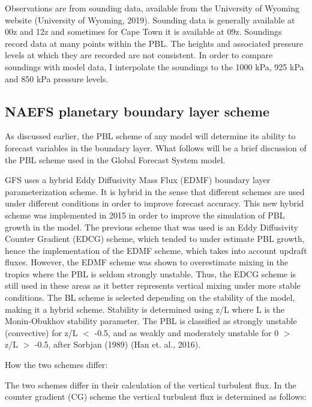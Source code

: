 \documentclass[12pt]{article}
\begin{document}
Observations are from sounding data, available from the University of Wyoming website 
(University of Wyoming, 2019).  Sounding data is generally available at 00z and 12z and 
sometimes for Cape Town it is available at 09z. Soundings record data at many points within 
the PBL. The heights and associated pressure levels at which they are recorded are not 
consistent. In order to compare soundings with model data, I interpolate the soundings 
to the 1000 kPa, 925 kPa and 850 kPa pressure levels. 






\subsection{NAEFS planetary boundary layer scheme}

As discussed earlier, the PBL scheme of any model will determine its ability to forecast 
variables in the boundary layer. What follows will be a brief discussion of the PBL scheme 
used in the Global Forecast System model. 

GFS uses a hybrid Eddy Diffusivity Mass Flux (EDMF) boundary layer parameterization scheme. 
It is hybrid in the sense that different schemes are used under different conditions in 
order to improve forecast accuracy.  This new hybrid scheme was implemented in 2015 in 
order to improve the simulation of PBL growth in the model. The previous scheme that was 
used is an Eddy Diffusivity Counter Gradient (EDCG) scheme, which tended to under estimate 
PBL growth, hence the implementation of the EDMF scheme, which takes into account updraft 
fluxes. However, the EDMF scheme was shown to overestimate mixing in the tropics where the 
PBL is seldom strongly unstable. Thus, the EDCG scheme is still used in these areas as it 
better represents vertical mixing under more stable conditions. The BL scheme is selected 
depending on the stability of the model, making it a hybrid scheme. Stability is determined 
using z/L where L is the Monin-Obukhov stability parameter. The PBL is classified as 
strongly unstable (convective) for z/L $<$ -0.5, and as weakly and moderately unstable 
for 0 $>$ z/L $>$ -0.5, after Sorbjan (1989) (Han et. al., 2016). 

\bigskip

How the two schemes differ:

\bigskip

The two schemes differ in their calculation of the vertical turbulent flux. In the counter 
gradient (CG) scheme the vertical turbulent flux is determined as follows:
\end{document}
